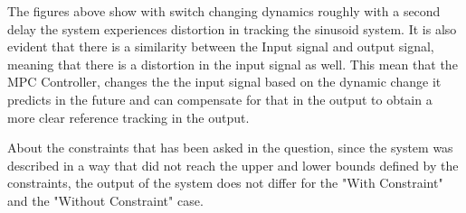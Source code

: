 \documentclass{article}
\begin{document}
The figures above show with switch changing dynamics roughly with a second delay the system experiences distortion in tracking the sinusoid system. It is also evident that there is a similarity between the Input signal and output signal, meaning that there is a distortion in the input signal as well. This mean that the MPC Controller, changes the the input signal based on the dynamic change it predicts in the future and can compensate for that in the output to obtain a more clear reference tracking in the output.

About the constraints that has been asked in the question, since the system was described in a way that did not reach the upper and lower bounds defined by the constraints, the output of the system does not differ for the "With Constraint" and the "Without Constraint" case.
\end{document}
